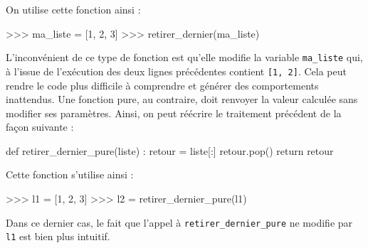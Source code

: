\documentclass[
  letterpaper,
  DIV=11,
  numbers=noendperiod]{scrartcl}
\newenvironment{Shaded}{\begin{snugshade}}{\end{snugshade}}
\newcommand{\ControlFlowTok}[1]{\textcolor[rgb]{0.00,0.23,0.31}{#1}}
\newcommand{\DecValTok}[1]{\textcolor[rgb]{0.68,0.00,0.00}{#1}}
\newcommand{\KeywordTok}[1]{\textcolor[rgb]{0.00,0.23,0.31}{#1}}
\newcommand{\NormalTok}[1]{\textcolor[rgb]{0.00,0.23,0.31}{#1}}
\newcommand{\OperatorTok}[1]{\textcolor[rgb]{0.37,0.37,0.37}{#1}}
\begin{document}
On utilise cette fonction ainsi :

\begin{Shaded}
\begin{Highlighting}[]
\OperatorTok{\textgreater{}\textgreater{}\textgreater{}}\NormalTok{ ma\_liste }\OperatorTok{=}\NormalTok{ [}\DecValTok{1}\NormalTok{, }\DecValTok{2}\NormalTok{, }\DecValTok{3}\NormalTok{]}
\OperatorTok{\textgreater{}\textgreater{}\textgreater{}}\NormalTok{ retirer\_dernier(ma\_liste)}
\end{Highlighting}
\end{Shaded}

L'inconvénient de ce type de fonction est qu'elle modifie la variable
\texttt{ma\_liste} qui, à l'issue de l'exécution des deux lignes
précédentes contient \texttt{{[}1,\ 2{]}}. Cela peut rendre le code plus
difficile à comprendre et générer des comportements inattendus. Une
fonction pure, au contraire, doit renvoyer la valeur calculée sans
modifier ses paramètres. Ainsi, on peut réécrire le traitement précédent
de la façon suivante :

\begin{Shaded}
\begin{Highlighting}[]
\KeywordTok{def}\NormalTok{ retirer\_dernier\_pure(liste) :}
\NormalTok{    retour }\OperatorTok{=}\NormalTok{ liste[:]}
\NormalTok{    retour.pop()}
    \ControlFlowTok{return}\NormalTok{ retour}
\end{Highlighting}
\end{Shaded}

Cette fonction s'utilise ainsi :

\begin{Shaded}
\begin{Highlighting}[]
\OperatorTok{\textgreater{}\textgreater{}\textgreater{}}\NormalTok{ l1 }\OperatorTok{=}\NormalTok{ [}\DecValTok{1}\NormalTok{, }\DecValTok{2}\NormalTok{, }\DecValTok{3}\NormalTok{]}
\OperatorTok{\textgreater{}\textgreater{}\textgreater{}}\NormalTok{ l2 }\OperatorTok{=}\NormalTok{ retirer\_dernier\_pure(l1)}
\end{Highlighting}
\end{Shaded}

Dans ce dernier cas, le fait que l'appel à
\texttt{retirer\_dernier\_pure} ne modifie par \texttt{l1} est bien plus
intuitif.
\end{document}
